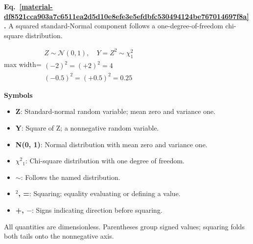 \documentclass[11pt,a4paper]{article}
\begin{document}
\par\medskip
\begin{samepage}
\label{material-df8521cca903a7c6511ea2d5d10e8efe3e5efdbfc530494124be767014697f8a}
\noindent\textbf{Eq.~\ref*{material-df8521cca903a7c6511ea2d5d10e8efe3e5efdbfc530494124be767014697f8a}.} A squared standard-Normal component follows a one-degree-of-freedom chi-square distribution.\par\nopagebreak
\begin{center}\begin{adjustbox}{max width=\linewidth}$\displaystyle \begin{gathered}Z\sim\mathcal N(0,1),\quad Y=Z^2\sim\chi^2_1\\(-2)^2=(+2)^2=4\\(-0.5)^2=(+0.5)^2=0.25\end{gathered}$\end{adjustbox}\end{center}

\par\noindent\textbf{Symbols}

\begin{itemize}\setlength{\itemsep}{1pt}\setlength{\parsep}{0pt}
\item \textbf{Z}: Standard-normal random variable; mean zero and variance one.
\item \textbf{Y}: Square of Z; a nonnegative random variable.
\item \textbf{N(0, 1)}: Normal distribution with mean zero and variance one.
\item \textbf{\ensuremath{\chi}\ensuremath{{}^2}\ensuremath{{}_1}}: Chi-square distribution with one degree of freedom.
\item \textbf{\ensuremath{\sim}}: Follows the named distribution.
\item \textbf{\ensuremath{{}^2}, =}: Squaring; equality evaluating or defining a value.
\item \textbf{+, \ensuremath{-}}: Signs indicating direction before squaring.
\end{itemize}

All quantities are dimensionless. Parentheses group signed values; squaring folds both tails onto the nonnegative axis.

\end{samepage}
\medskip
\end{document}

